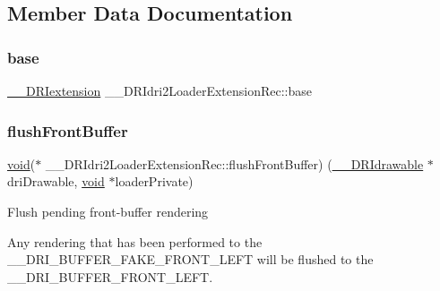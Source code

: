 \subsection{Member Data Documentation}
\mbox{\label{struct_____d_r_idri2_loader_extension_rec_a017db553ff9b672e344aca9f6846711e}} 
\subsubsection{\texorpdfstring{base}{base}}
{\footnotesize\ttfamily \hyperlink{dri__interface_8h_a4e0a61c8ece00d2b2c6792a9a1b55385}{\+\_\+\+\_\+\+D\+R\+Iextension} \+\_\+\+\_\+\+D\+R\+Idri2\+Loader\+Extension\+Rec\+::base}

\mbox{\label{struct_____d_r_idri2_loader_extension_rec_a40e4f92207897e6c0d8ebd3dafe2a807}} 
\subsubsection{\texorpdfstring{flush\+Front\+Buffer}{flushFrontBuffer}}
{\footnotesize\ttfamily \hyperlink{_s_d_l__opengles2__gl2ext_8h_ae5d8fa23ad07c48bb609509eae494c95}{void}($\ast$ \+\_\+\+\_\+\+D\+R\+Idri2\+Loader\+Extension\+Rec\+::flush\+Front\+Buffer) (\hyperlink{dri__interface_8h_a5bfb832a0a08208d95b3bbef439d2262}{\+\_\+\+\_\+\+D\+R\+Idrawable} $\ast$dri\+Drawable, \hyperlink{_s_d_l__opengles2__gl2ext_8h_ae5d8fa23ad07c48bb609509eae494c95}{void} $\ast$loader\+Private)}

Flush pending front-\/buffer rendering

Any rendering that has been performed to the {\ttfamily \+\_\+\+\_\+\+D\+R\+I\+\_\+\+B\+U\+F\+F\+E\+R\+\_\+\+F\+A\+K\+E\+\_\+\+F\+R\+O\+N\+T\+\_\+\+L\+E\+FT} will be flushed to the {\ttfamily \+\_\+\+\_\+\+D\+R\+I\+\_\+\+B\+U\+F\+F\+E\+R\+\_\+\+F\+R\+O\+N\+T\+\_\+\+L\+E\+FT}.


